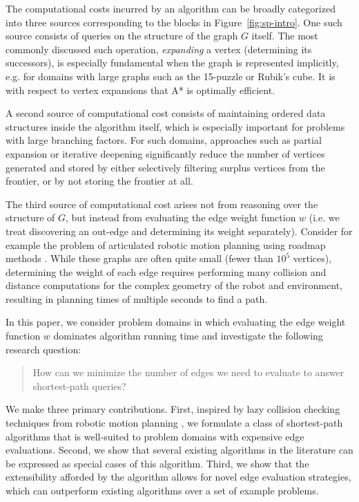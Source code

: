 \documentclass[nobib]{tufte-book}
\begin{document}
The computational costs incurred by an algorithm
can be broadly categorized into three sources
corresponding to the blocks in Figure~\ref{fig:sp-intro}.
One such source consists of queries on the structure
of the graph $G$ itself.
The most commonly discussed such operation,
\emph{expanding} a vertex (determining its successors),
is especially fundamental
when the graph is represented implicitly,
e.g. for domains with large graphs
such as the 15-puzzle or Rubik's cube.
It is with respect to vertex expansions
that A* \citep{hart1968astar} is optimally efficient.

A second source of computational cost consists of maintaining
ordered data structures inside the algorithm itself,
which is especially important for problems with large branching
factors.
For such domains,
approaches such as partial expansion \citep{yoshizumi2000peastar}
or iterative deepening \citep{korf1985idastar}
significantly reduce the number of vertices generated and stored
by either selectively filtering surplus vertices from the frontier,
or by not storing the frontier at all.

The third source of computational cost arises not from reasoning
over the structure of $G$,
but instead from evaluating the edge weight function $w$
(i.e. we treat discovering an out-edge and determining its weight
separately).
Consider for example the problem of articulated robotic motion planning
using roadmap methods \citep{kavrakietal1996prm}.
While these graphs are often quite small
(fewer than $10^5$ vertices),
determining the weight of each edge requires performing many
collision and distance computations for the complex geometry
of the robot and environment,
resulting in planning times of multiple seconds to find a path.

In this paper,
we consider problem domains in which evaluating the edge weight
function $w$ dominates algorithm running time
and investigate the following research question:
\begin{quote}
How can we minimize the number of edges we need to evaluate
to answer shortest-path queries?
\end{quote}

We make three primary contributions.
First,
inspired by lazy collision checking techniques from 
robotic motion planning \citep{bohlin2000lazyprm},
we formulate a class of shortest-path algorithms 
that is well-suited to problem domains with expensive edge evaluations.
Second,
we show that several existing algorithms in the literature
can be expressed as special cases of this algorithm.
Third,
we show that the extensibility afforded by the algorithm allows for
novel edge evaluation strategies,
which can outperform existing algorithms
over a set of example problems.
\end{document}
